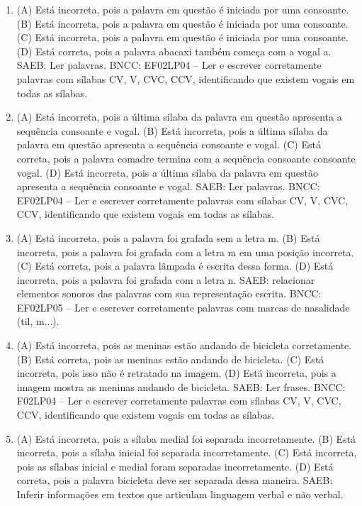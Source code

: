 \begin{enumerate}
\item
(A) Está incorreta, pois a palavra em questão é iniciada por uma consoante.
(B) Está incorreta, pois a palavra em questão é iniciada por uma consoante.
(C) Está incorreta, pois a palavra em questão é iniciada por uma consoante.
(D) Está correta, pois a palavra abacaxi também começa com a vogal a.
SAEB: Ler palavras.
BNCC: EF02LP04 -- Ler e escrever corretamente palavras com
sílabas CV, V, CVC, CCV, identificando que existem vogais em todas as
sílabas.

\item
(A) Está incorreta, pois a última sílaba da palavra em questão apresenta a sequência consoante e vogal.
(B) Está incorreta, pois a última sílaba da palavra em questão apresenta a sequência consoante e vogal.
(C) Está correta, pois a palavra comadre termina com a sequência consoante consoante vogal.
(D) Está incorreta, pois a última sílaba da palavra em questão apresenta a sequência consoante e vogal.
SAEB: Ler palavras.
BNCC: EF02LP04 -- Ler e escrever corretamente palavras com
sílabas CV, V, CVC, CCV, identificando que existem vogais em todas as
sílabas.

\item
(A) Está incorreta, pois a palavra foi grafada sem a letra m.
(B) Está incorreta, pois a palavra foi grafada com a letra m em uma posição incorreta.
(C) Está correta, pois a palavra lâmpada é escrita dessa forma.
(D) Está incorreta, pois a palavra foi grafada com a letra n.
SAEB: relacionar elementos sonoros das palavras com sua representação
escrita.
BNCC: EF02LP05 -- Ler e escrever corretamente palavras com marcas de nasalidade
(til, m...).

\item
(A) Está incorreta, pois as meninas estão andando de bicicleta corretamente.
(B) Está correta, pois as meninas estão andando de bicicleta.
(C) Está incorreta, pois isso não é retratado na imagem.
(D) Está incorreta, pois a imagem mostra as meninas andando de bicicleta.
SAEB: Ler frases.
BNCC: F02LP04 -- Ler e escrever corretamente palavras com sílabas
CV, V, CVC, CCV, identificando que existem vogais em todas as sílabas.

\item
(A) Está incorreta, pois a sílaba medial foi separada incorretamente.
(B) Está incorreta, pois a sílaba inicial foi separada incorretamente.
(C) Está incorreta, pois as sílabas inicial e medial foram separadas incorretamente.
(D) Está correta, pois a palavra bicicleta deve ser separada dessa maneira.
SAEB: Inferir informações em textos que articulam linguagem verbal e não verbal.


\end{enumerate}
